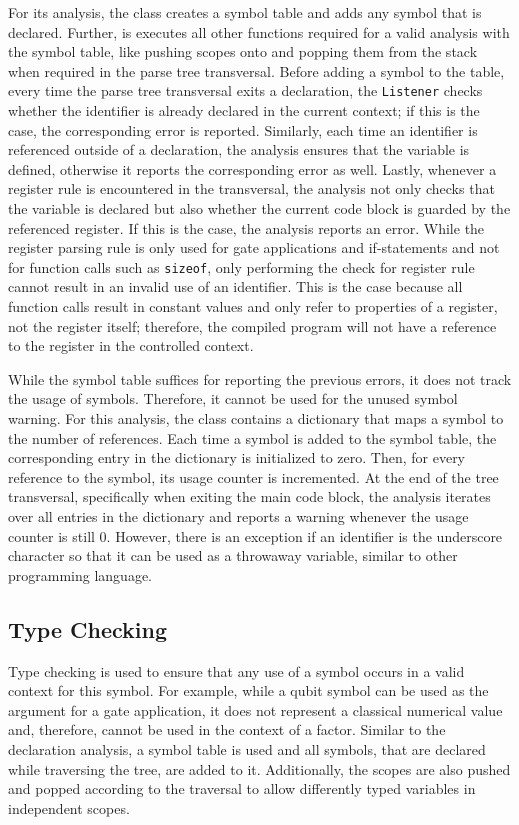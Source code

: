 For its analysis, the class creates a symbol table and adds any symbol that is declared. Further, is executes all other functions required for a valid analysis with the symbol table, like pushing scopes onto and popping them from the stack when required in the parse tree transversal. Before adding a symbol to the table, \ie every time the parse tree transversal exits a declaration, the \texttt{Listener} checks whether the identifier is already declared in the current context; if this is the case, the corresponding error is reported. Similarly, each time an identifier is referenced outside of a declaration, the analysis ensures that the variable is defined, otherwise it reports the corresponding error as well. Lastly, whenever a register rule is encountered in the transversal, the analysis not only checks that the variable is declared but also whether the current code block is guarded by the referenced register. If this is the case, the analysis reports an error. While the register parsing rule is only used for gate applications and if-statements and not for function calls such as \texttt{sizeof}, only performing the check for register rule cannot result in an invalid use of an identifier. This is the case because all function calls result in constant values and only refer to properties of a register, not the register itself; therefore, the compiled program will not have a reference to the register in the controlled context.

While the symbol table suffices for reporting the previous errors, it does not track the usage of symbols. Therefore, it cannot be used for the unused symbol warning. For this analysis, the class contains a dictionary that maps a symbol to the number of references. Each time a symbol is added to the symbol table, the corresponding entry in the dictionary is initialized to zero. Then, for every reference to the symbol, its usage counter is incremented. At the end of the tree transversal, specifically when exiting the main code block, the analysis iterates over all entries in the dictionary and reports a warning whenever the usage counter is still $0$. However, there is an exception if an identifier is the underscore character so that it can be used as a throwaway variable, similar to other programming language.  

\subsection{Type Checking}
\label{sec:implementation_typeCheckingAnalayis}
Type checking is used to ensure that any use of a symbol occurs in a valid context for this symbol. For example, while a qubit symbol can be used as the argument for a gate application, it does not represent a classical numerical value and, therefore, cannot be used in the context of a factor. Similar to the declaration analysis, a symbol table is used and all symbols, that are declared while traversing the tree, are added to it. Additionally, the scopes are also pushed and popped according to the traversal to allow differently typed variables in independent scopes.

